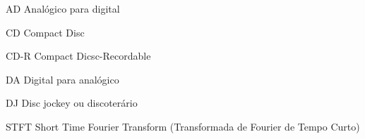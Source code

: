 \begin{siglas}

\item[AD] Analógico para digital
\item[CD] Compact Disc
\item[CD-R] Compact Dicsc-Recordable
\item[DA] Digital para analógico
\item[DJ] Disc jockey ou discoterário
\item[STFT] Short Time Fourier Transform (Transformada de Fourier de Tempo Curto) 

\end{siglas}
